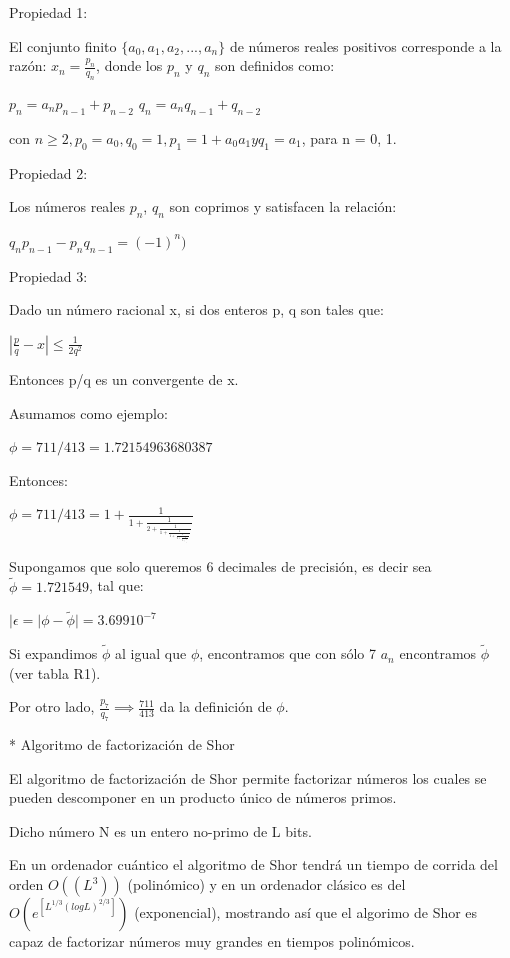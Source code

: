 \documentclass[11pt, spanish]{report}
\begin{document}
Propiedad 1:

El conjunto finito $\{a_0,a_1,a_2,...,a_n\}$ de números reales positivos corresponde a la razón: $x_n = \frac{p_n}{q_n}$, donde los $p_n$ y $q_n$ son definidos como:

$p_n = a_n p_{n-1} + p_{n-2}$
$q_n = a_n q_{n-1} + q_{n-2}$

con $n \geq 2, p_0 = a_0, q_0 = 1, p_1 = 1 + a_0 a_1 y q_1 = a_1$, para n = 0, 1.

Propiedad 2:

Los números reales $p_n$, $q_n$ son coprimos y satisfacen la relación:

$q_n p_{n-1} - p_n q_{n-1} = (-1)^n)$

Propiedad 3:

Dado un número racional x, si dos enteros p, q son tales que:

$|\frac{p}{q} - x| \leq \frac{1}{2q^2}$

Entonces p/q es un convergente de x.

Asumamos como ejemplo:

$\phi = 711/413 = 1.72154963680387$

Entonces:

$\phi = 711/413 = 1 + \frac{1}{1 + \frac{1}{2 + \frac{1}{1 + \frac{1}{1 + \frac{1}{2 + \frac{1}{4 + \frac{1}{5}}}}}}}$

Supongamos que solo queremos 6 decimales de precisión, es decir sea $\tilde{\phi} = 1.721549$, tal que:

$|\epsilon = |\phi - \tilde{\phi}| = 3.699 10^{-7}$

Si expandimos $\tilde{\phi}$ al igual que $\phi$, encontramos que con sólo 7 $a_n$ encontramos $\tilde{\phi}$ (ver tabla R1).

Por otro lado, $\frac{p_7}{q_7} \implies \frac{711}{413}$ da la definición de $\phi$.

* Algoritmo de factorización de Shor

El algoritmo de factorización de Shor permite factorizar números los cuales se pueden descomponer en un producto único de números primos.

Dicho número N es un entero no-primo de L bits.

En un ordenador cuántico el algoritmo de Shor tendrá un tiempo de corrida del orden $O((L^3))$ (polinómico) y en un ordenador clásico es del $O(e^[L^{1/3} (log L)^{2/3}])$ (exponencial), mostrando así que el algorimo de Shor es capaz de factorizar números muy grandes en tiempos polinómicos.
\end{document}
